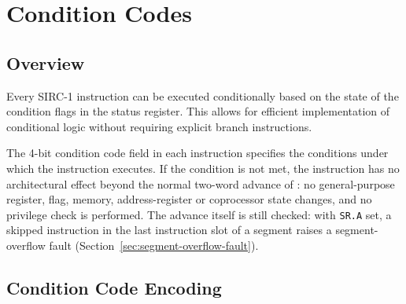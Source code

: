 \chapter{Condition Codes}
\label{ch:condition-codes}

\section{Overview}

Every SIRC-1 instruction can be executed conditionally based on the state of the condition flags in the status
register. This allows for efficient implementation of conditional logic without requiring explicit branch instructions.

The 4-bit condition code field in each instruction specifies the conditions under which the instruction executes. If
the condition is not met, the instruction has no architectural effect beyond the normal two-word advance of : no
general-purpose register, flag, memory, address-register or coprocessor state changes, and no privilege check is
performed. The advance itself is still checked: with \texttt{SR.A} set, a skipped instruction in the last instruction
slot of a segment raises a segment-overflow fault (Section~\ref{sec:segment-overflow-fault}).

\section{Condition Code Encoding}

